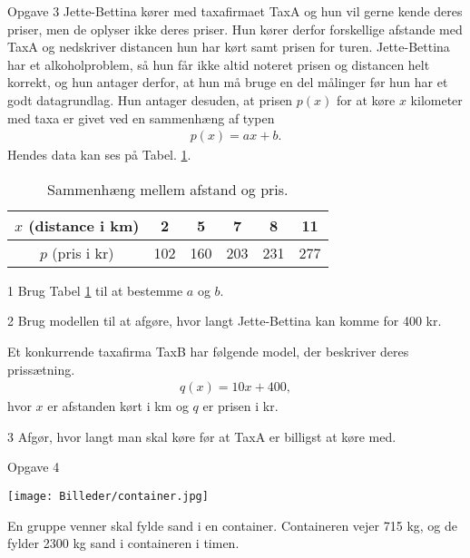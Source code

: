 \begin{opgavetekst}{Opgave 3}
	Jette-Bettina kører med taxafirmaet TaxA og hun vil gerne kende deres priser,  men de oplyser ikke deres priser. Hun kører derfor forskellige afstande med TaxA og nedskriver distancen hun har kørt 		samt prisen for turen. Jette-Bettina har et alkoholproblem, så hun får ikke altid noteret prisen og distancen helt korrekt, og hun antager derfor, at hun må bruge en del målinger før hun har et 		    godt datagrundlag. Hun antager desuden, at prisen $p(x)$ for at køre $x$ kilometer med taxa er givet ved en sammenhæng af typen
	\begin{align*}
		p(x) = ax+b.
	\end{align*}
	Hendes data kan ses på Tabel. \ref{tab:taxa}.
	\begin{table}[H]
		\centering
		\begin{tabular}{c|c|c|c|c|c}
			$x$ (distance i km) & 2 & 5 & 7 & 8 & 11 \\
			\hline
			$p$ (pris i kr) & 102 & 160 & 203 & 231 & 277
		\end{tabular}
		\caption{Sammenhæng mellem afstand og pris.}
		\label{tab:taxa}
	\end{table}
	\phantom{h}
\end{opgavetekst}
\begin{delopgave}{}{1}
	Brug Tabel \ref{tab:taxa} til at bestemme $a$ og $b$.
\end{delopgave}
\begin{delopgave}{}{2}
	Brug modellen til at afgøre, hvor langt Jette-Bettina kan komme for 400 kr.
\end{delopgave}
\begin{meretekst}
	Et konkurrende taxafirma TaxB har følgende model, der beskriver deres prissætning.
	\begin{align*}
		q(x) = 10x + 400,
	\end{align*}
	hvor $x$ er afstanden kørt i km og $q$ er prisen i kr. 
\end{meretekst}
\begin{delopgave}{}{3}
	Afgør, hvor langt man skal køre før at TaxA er billigst at køre med.
\end{delopgave}
\begin{opgavetekst}{Opgave 4}
	\begin{center}
		\texttt{[image: Billeder/container.jpg]}
	\end{center}
	En gruppe venner skal fylde sand i en container. Containeren vejer 715 kg, og de fylder 2300 kg sand i containeren i timen. 
\end{opgavetekst}
